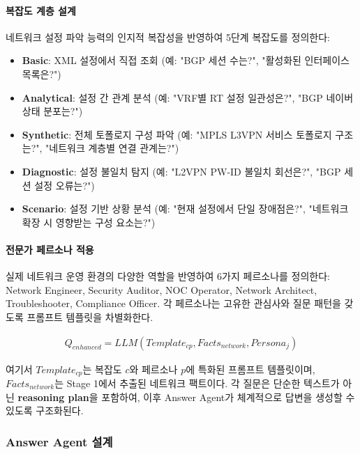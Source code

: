 \documentclass[twocolumn, 10pt]{article}
\begin{document}
\paragraph{복잡도 계층 설계}
네트워크 설정 파악 능력의 인지적 복잡성을 반영하여 5단계 복잡도를 정의한다:
\begin{itemize}
\item \textbf{Basic}: XML 설정에서 직접 조회 (예: "BGP 세션 수는?", "활성화된
  인터페이스 목록은?")

\item \textbf{Analytical}: 설정 간 관계 분석 (예: "VRF별 RT 설정 일관성은?",
  "BGP 네이버 상태 분포는?")

\item \textbf{Synthetic}: 전체 토폴로지 구성 파악 (예: "MPLS L3VPN 서비스
  토폴로지 구조는?", "네트워크 계층별 연결 관계는?")

\item \textbf{Diagnostic}: 설정 불일치 탐지 (예: "L2VPN PW-ID 불일치 회선은?",
  "BGP 세션 설정 오류는?")

\item \textbf{Scenario}: 설정 기반 상황 분석 (예: "현재 설정에서 단일
  장애점은?", "네트워크 확장 시 영향받는 구성 요소는?")
\end{itemize}

\paragraph{전문가 페르소나 적용}
실제 네트워크 운영 환경의 다양한 역할을 반영하여 6가지 페르소나를 정의한다: Network
Engineer, Security Auditor, NOC Operator, Network Architect, Troubleshooter,
Compliance Officer. 각 페르소나는 고유한 관심사와 질문 패턴을 갖도록 프롬프트 템플릿을
차별화한다.

\begin{align}
Q_{enhanced}= LLM(Template_{cp}, Facts_{network}, Persona_{j}) \label{eq:llm_based}
\end{align}

여기서 $Template_{cp}$는 복잡도 $c$와 페르소나 $p$에 특화된 프롬프트 템플릿이며,
$Facts_{network}$는 Stage 1에서 추출된 네트워크 팩트이다. 각 질문은 단순한
텍스트가 아닌 \textbf{reasoning plan}을 포함하여, 이후 Answer Agent가 체계적으로
답변을 생성할 수 있도록 구조화된다.

\subsubsection{Answer Agent 설계}
\end{document}
